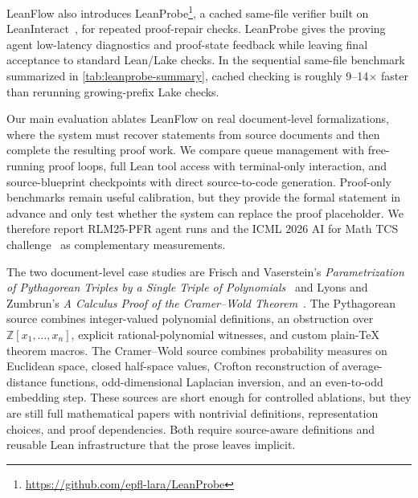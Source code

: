 \documentclass{article}
\newcommand{\method}{LeanFlow\xspace}
\newcommand{\lean}{Lean\xspace}
\begin{document}
\method also introduces LeanProbe\footnote{\url{https://github.com/epfl-lara/LeanProbe}}, a cached same-file verifier built on LeanInteract~\citep{leaninteract2025}, for repeated proof-repair checks.
LeanProbe gives the proving agent low-latency diagnostics and proof-state feedback while leaving final acceptance to standard \lean/Lake checks.
In the sequential same-file benchmark summarized in \cref{tab:leanprobe-summary}, cached checking is roughly 9--14$\times$ faster than rerunning growing-prefix Lake checks.

Our main evaluation ablates \method on real document-level formalizations, where the system must recover statements from source documents and then complete the resulting proof work.
We compare queue management with free-running proof loops, full \lean tool access with terminal-only interaction, and source-blueprint checkpoints with direct source-to-code generation.
Proof-only benchmarks remain useful calibration, but they provide the formal statement in advance and only test whether the system can replace the proof placeholder.
We therefore report RLM25-PFR agent runs and the ICML 2026 AI for Math TCS challenge~\citep{ai4math2026challenge} as complementary measurements.

The two document-level case studies are Frisch and Vaserstein's \emph{Parametrization of Pythagorean Triples by a Single Triple of Polynomials}~\citep{frisch2007pythagorean} and Lyons and Zumbrun's \emph{A Calculus Proof of the Cramer--Wold Theorem}~\citep{lyons2017cramerwold}.
The Pythagorean source combines integer-valued polynomial definitions, an obstruction over $\mathbb{Z}[x_1,\ldots,x_n]$, explicit rational-polynomial witnesses, and custom plain-\TeX{} theorem macros.
The Cramer--Wold source combines probability measures on Euclidean space, closed half-space values, Crofton reconstruction of average-distance functions, odd-dimensional Laplacian inversion, and an even-to-odd embedding step.
These sources are short enough for controlled ablations, but they are still full mathematical papers with nontrivial definitions, representation choices, and proof dependencies.
Both require source-aware definitions and reusable \lean infrastructure that the prose leaves implicit.
\end{document}
